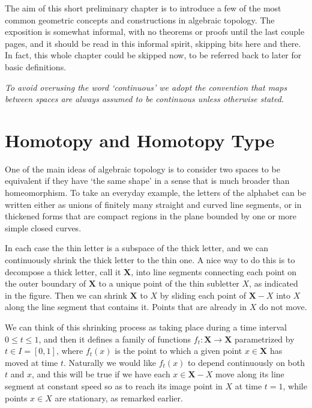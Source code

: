 
The aim of this short preliminary chapter is to introduce a few of the most common
geometric concepts and constructions in algebraic topology. The exposition is somewhat
informal, with no theorems or proofs until the last couple pages, and it should be read
in this informal spirit, skipping bits here and there. In fact, this whole chapter could
be skipped now, to be referred back to later for basic definitions.

\textit{To avoid overusing the word `continuous' we adopt the convention that maps
between spaces are always assumed to be continuous unless otherwise stated.}

\section{Homotopy and Homotopy Type}

One of the main ideas of algebraic topology is to consider two spaces to be equivalent
if they have `the same shape' in a sense that is much broader than homeomorphism. To
take an everyday example, the letters of the alphabet can be written either as unions of
finitely many straight and curved line segments, or in thickened forms that are compact
regions in the plane bounded by one or more simple closed curves.



In each case the thin letter is a subspace of the thick letter, and we can continuously
shrink the thick letter to the thin one. A nice way to do this is to decompose a thick
letter, call it $\mathbf{X}$, into line segments connecting each point on the outer boundary
of $\mathbf{X}$ to a unique point of the thin subletter $X$, as indicated in the figure. Then we
can shrink $\mathbf{X}$ to $X$ by sliding each point of $\mathbf{X} - X$ into $X$ along the line segment
that contains it. Points that are already in $X$ do not move.

We can think of this shrinking process as taking place during a time interval
$0 \le t \le 1$, and then it defines a family of functions $f_t : \mathbf{X} \to \mathbf{X}$ parametrized
by $t \in I = [0,1]$, where $f_t(x)$ is the point to which a given point $x \in \mathbf{X}$ has moved
at time $t$. Naturally we would like $f_t(x)$ to depend continuously on both $t$ and $x$,
and this will be true if we have each $x \in \mathbf{X} - X$ move along its line segment at
constant speed so as to reach its image point in $X$ at time $t=1$, while points $x \in X$
are stationary, as remarked earlier.

